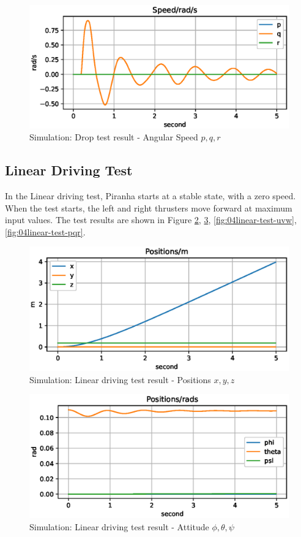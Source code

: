 \begin{figure}[H]
    \centering
    \includegraphics[width=.8\textwidth]{images/04drop-test-pqr.eps}
    \caption{Simulation: Drop test result - Angular Speed $p, q, r$}
    \label{fig:04drop-test-pqr}
\end{figure}

\subsection{Linear Driving Test}

In the Linear driving test, Piranha starts at a stable state, with a zero speed. When the test starts, the left and right thrusters move forward at maximum input values. The test results are shown in Figure \ref{fig:04linear-test-xyz}, \ref{fig:04linear-test-ptp}, \ref{fig:04linear-test-uvw}, \ref{fig:04linear-test-pqr}.

\begin{figure}[H]
    \centering
    \includegraphics[width=.8\textwidth]{images/04linear-test-xyz.eps}
    \caption{Simulation: Linear driving test result - Positions $x, y,z$}
    \label{fig:04linear-test-xyz}
\end{figure}

\begin{figure}[H]
    \centering
    \includegraphics[width=.8\textwidth]{images/04linear-test-ptp.eps}
    \caption{Simulation: Linear driving test result - Attitude $\phi, \theta, \psi$}
    \label{fig:04linear-test-ptp}
\end{figure}


